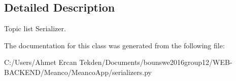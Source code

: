 \subsection{Detailed Description}
Topic list Serializer. 

The documentation for this class was generated from the following file\+:\begin{DoxyCompactItemize}
\item 
C\+:/\+Users/\+Ahmet Ercan Tekden/\+Documents/bounswe2016group12/\+W\+E\+B-\/\+B\+A\+C\+K\+E\+N\+D/\+Meanco/\+Meanco\+App/serializers.\+py\end{DoxyCompactItemize}
